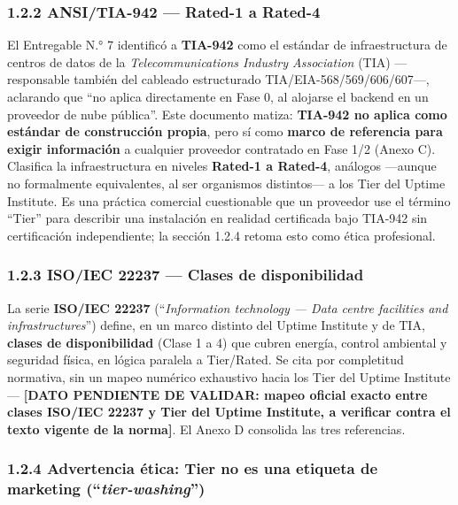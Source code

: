 \documentclass[11pt,a4paper]{article}
\begin{document}
\subsubsection{1.2.2 ANSI/TIA-942 --- Rated-1 a Rated-4}\label{ansitia-942-rated-1-a-rated-4}

El Entregable N.° 7 identificó a \textbf{TIA-942} como el estándar de infraestructura de centros de datos de la \emph{Telecommunications Industry Association} (TIA) ---responsable también del cableado estructurado TIA/EIA-568/569/606/607---, aclarando que ``no aplica directamente en Fase 0, al alojarse el backend en un proveedor de nube pública''. Este documento matiza: \textbf{TIA-942 no aplica como estándar de construcción propia}, pero sí como \textbf{marco de referencia para exigir información} a cualquier proveedor contratado en Fase 1/2 (Anexo C). Clasifica la infraestructura en niveles \textbf{Rated-1 a Rated-4}, análogos ---aunque no formalmente equivalentes, al ser organismos distintos--- a los Tier del Uptime Institute. Es una práctica comercial cuestionable que un proveedor use el término ``Tier'' para describir una instalación en realidad certificada bajo TIA-942 sin certificación independiente; la sección 1.2.4 retoma esto como ética profesional.

\subsubsection{1.2.3 ISO/IEC 22237 --- Clases de disponibilidad}\label{isoiec-22237-clases-de-disponibilidad}

La serie \textbf{ISO/IEC 22237} (``\emph{Information technology --- Data centre facilities and infrastructures}'') define, en un marco distinto del Uptime Institute y de TIA, \textbf{clases de disponibilidad} (Clase 1 a 4) que cubren energía, control ambiental y seguridad física, en lógica paralela a Tier/Rated. Se cita por completitud normativa, sin un mapeo numérico exhaustivo hacia los Tier del Uptime Institute --- \textbf{{[}DATO PENDIENTE DE VALIDAR: mapeo oficial exacto entre clases ISO/IEC 22237 y Tier del Uptime Institute, a verificar contra el texto vigente de la norma{]}}. El Anexo D consolida las tres referencias.

\subsubsection{\texorpdfstring{1.2.4 Advertencia ética: Tier no es una etiqueta de marketing (``\emph{tier-washing}'')}{1.2.4 Advertencia ética: Tier no es una etiqueta de marketing (``tier-washing'')}}\label{advertencia-uxe9tica-tier-no-es-una-etiqueta-de-marketing-tier-washing}
\end{document}
